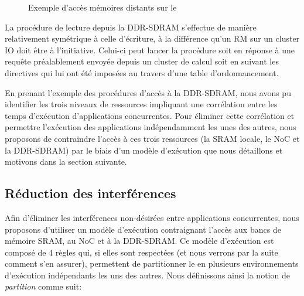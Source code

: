 \documentclass[main.tex]{subfiles}
\begin{document}
\begin{figure}
\begin{center}
    
	\caption{Exemple d'accès mémoires distants sur le \mppalong}
	\label{resumeFr_MPPAremoteMem}
\end{center}
\end{figure}
La procédure de lecture depuis la DDR-SDRAM s'effectue de manière relativement symétrique à celle d'écriture, à la différence qu'un RM sur un cluster IO doit être à l'initiative. Celui-ci peut lancer la procédure soit en réponse à une requête préalablement envoyée depuis un cluster de calcul soit en suivant les directives qui lui ont été imposées au travers d'une table d'ordonnancement.

En prenant l'exemple des procédures d'accès à la DDR-SDRAM, nous avons pu identifier les trois niveaux de ressources impliquant une corrélation entre les temps d'exécution d'applications concurrentes. Pour éliminer cette corrélation et permettre l'exécution des applications indépendamment les unes des autres, nous proposons de contraindre l'accès à ces trois ressources (la SRAM locale, le NoC et la DDR-SDRAM) par le biais d'un modèle d'exécution que nous détaillons et motivons dans la section suivante.



\subsection{Réduction des interférences}
\label{ssec_resumeFr_reducInterference}
Afin d'éliminer les interférences non-désirées entre applications concurrentes, nous proposons d'utiliser un modèle d'exécution contraignant l'accès aux bancs de mémoire SRAM, au NoC et à la DDR-SDRAM. Ce modèle d'exécution est composé de 4 règles qui, si elles sont respectées (et nous verrons par la suite comment s'en assurer), permettent de partitionner le \mppalong en plusieurs environnements d'exécution indépendants les uns des autres. Nous définissons ainsi la notion de \emph{partition} comme suit:
\end{document}
